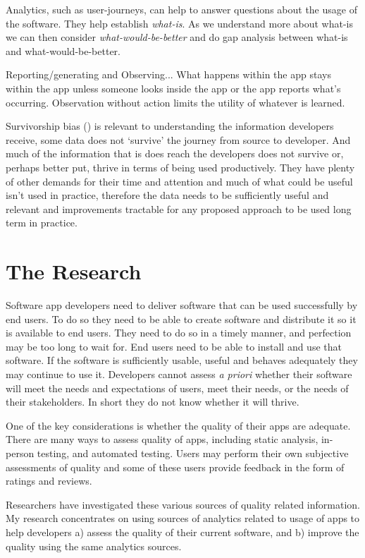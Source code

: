 Analytics, such as user-journeys, can help to answer questions about the usage of the software. They help establish \emph{what-is}. As we understand more about what-is we can then consider \emph{what-would-be-better} and do gap analysis between what-is and what-would-be-better.

Reporting/generating and Observing... What happens within the app stays within the app unless someone looks inside the app or the app reports what's occurring. Observation without action limits the utility of whatever is learned. 

Survivorship bias (\cite{wikipedia_survivorship_bias}) is relevant to understanding the information developers receive, some data does not `survive' the journey from source to developer. And much of the information that is does reach the developers does not survive or, perhaps better put, thrive in terms of being used productively. They have plenty of other demands for their time and attention and much of what could be useful isn't used in practice, therefore the data needs to be sufficiently useful and relevant and improvements tractable for any proposed approach to be used long term in practice.



\section{The Research}
Software app developers need to deliver software that can be used successfully by end users. To do so they need to be able to create software and distribute it so it is available to end users. They need to do so in a timely manner, and perfection may be too long to wait for. End users need to be able to install and use that software. If the software is sufficiently usable, useful and behaves adequately they may continue to use it. Developers cannot assess \emph{a priori} whether their software will meet the needs and expectations of users, meet their needs, or the needs of their stakeholders. In short they do not know whether it will thrive.

One of the key considerations is whether the quality of their apps are adequate. There are many ways to assess quality of apps, including static analysis, in-person testing, and automated testing. Users may perform their own subjective assessments of quality and some of these users provide feedback in the form of ratings and reviews. 

Researchers have investigated these various sources of quality related information. My research concentrates on using sources of analytics related to usage of apps to help developers a) assess the quality of their current software, and b) improve the quality using the same analytics sources.

